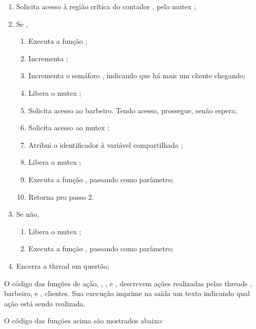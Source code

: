 \documentclass[
	12pt,				%
	openright,			%
	oneside,			%
	a4paper,			%
	chapter=TITLE,		%
	english,			%
	french,				%
	spanish,			%
	brazil				%
	]{abntex2}
\theoremstyle{definition}
\begin{document}
\begin{enumerate}
    \item Solicita acesso à região crítica do contador , pelo mutex ;
    \item Se ,
    \begin{enumerate}
        \item Executa a função ;
        \item Incrementa ;
        \item Incrementa o semáforo , indicando que há mais um cliente chegando;
        \item Libera o mutex ;
        \item Solicita acesso ao barbeiro. Tendo acesso, prossegue, senão espera;
        \item Solicita acesso ao mutex ;
        \item Atribui o identificador  à variável compartilhada ;
        \item Libera o mutex ;
        \item Executa a função , passando  como parâmetro;
        \item Retorna pro passo 2.
    \end{enumerate}
    \item Se não,
    \begin{enumerate}
        \item Libera o mutex ;
        \item Executa a função , passando  como parâmetro;
    \end{enumerate}
    \item Encerra a thread  em questão;
\end{enumerate}

O código das funções de ação, , ,  e , descrevem ações realizadas pelas threads , barbeiro, e , clientes. Sua execução imprime na saída um texto indicando qual ação está sendo realizada. 

O código das funções acima são mostrados abaixo:
\end{document}
